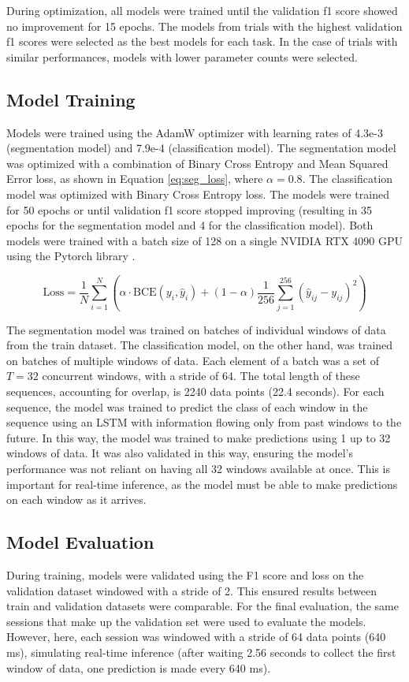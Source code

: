 \documentclass[conference]{IEEEtran}
\begin{document}
During optimization, all models were trained until the validation f1 score showed no improvement for 15 epochs. The models from trials with the highest validation f1 scores were selected as the best models for each task. In the case of trials with similar performances, models with lower parameter counts were selected.

\subsection{Model Training}
Models were trained using the AdamW optimizer with learning rates of 4.3e-3 (segmentation model) and 7.9e-4 (classification model). The segmentation model was optimized with a combination of Binary Cross Entropy and Mean Squared Error loss, as shown in Equation \ref{eq:seg_loss}, where $\alpha=0.8$. The classification model was optimized with Binary Cross Entropy loss. The models were trained for 50 epochs or until validation f1 score stopped improving (resulting in 35 epochs for the segmentation model and 4 for the classification model). Both models were trained with a batch size of 128 on a single NVIDIA RTX 4090 GPU using the Pytorch library \cite{paszke_2019}. 

\begin{equation}
    \text{Loss} = \frac{1}{N} \sum_{i=1}^{N} \left( \alpha\cdot\text{BCE}(y_i, \hat y_i) + (1-\alpha)\frac{1}{256} \sum_{j=1}^{256} (\hat y_{ij} - y_{ij})^2 \right)
    \label{eq:seg_loss}
\end{equation}

The segmentation model was trained on batches of individual windows of data from the train dataset. The classification model, on the other hand, was trained on batches of multiple windows of data. Each element of a batch was a set of $T=32$ concurrent windows, with a stride of 64. The total length of these sequences, accounting for overlap, is 2240 data points (22.4 seconds). For each sequence, the model was trained to predict the class of each window in the sequence using an LSTM with information flowing only from past windows to the future. In this way, the model was trained to make predictions using 1 up to 32 windows of data. It was also validated in this way, ensuring the model's performance was not reliant on having all 32 windows available at once. This is important for real-time inference, as the model must be able to make predictions on each window as it arrives.

\subsection{Model Evaluation}\label{sec:model_evaluation}
During training, models were validated using the F1 score and loss on the validation dataset windowed with a stride of 2. This ensured results between train and validation datasets were comparable. For the final evaluation, the same sessions that make up the validation set were used to evaluate the models. However, here, each session was windowed with a stride of 64 data points (640 ms), simulating real-time inference (after waiting 2.56 seconds to collect the first window of data, one prediction is made every 640 ms). 
\end{document}

